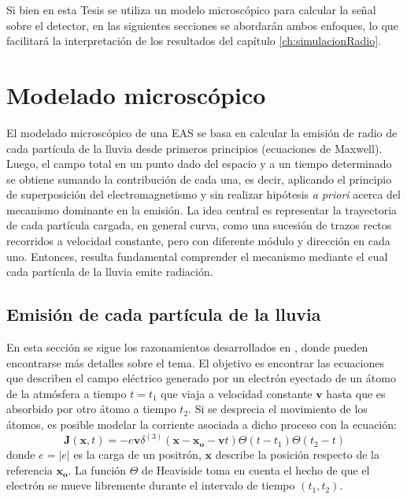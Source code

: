 Si bien en esta Tesis se utiliza un modelo microsc\'opico para calcular la se\~nal sobre el detector, en las siguientes secciones se abordar\'an ambos enfoques, lo que facilitar\'a la interpretaci\'on de los resultados del cap\'itulo \ref{ch:simulacionRadio}.

\section{Modelado microsc\'opico}

El modelado microsc\'opico de una EAS se basa en calcular la emisi\'on de radio de cada part\'icula de la lluvia desde primeros principios (ecuaciones de Maxwell).
Luego, el campo total en un punto dado del espacio y a un tiempo determinado se obtiene sumando la contribuci\'on de cada una, es decir, aplicando el principio de superposici\'on del electromagnetismo y sin realizar hip\'otesis \emph{a priori} acerca del mecanismo dominante en la emisi\'on.
La idea central es representar la trayectoria de cada part\'icula cargada, en general curva, como una sucesi\'on de trazos rectos recorridos a velocidad constante, pero con diferente m\'odulo y direcci\'on en cada uno.
Entonces, resulta fundamental comprender el mecanismo mediante el cual cada part\'icula de la lluvia emite radiaci\'on.

\subsection{Emisi\'on de cada part\'icula de la lluvia}

En esta secci\'on se sigue los razonamientos desarrollados en \cite{alvarez:2013}, donde pueden encontrarse m\'as detalles sobre el tema.
El objetivo es encontrar las ecuaciones que describen el campo el\'ectrico generado por un electr\'on eyectado de un \'atomo de la atm\'osfera a tiempo $t=t_1$ que viaja a velocidad constante $\mathbf{v}$ hasta que es absorbido por otro \'atomo a tiempo $t_2$.
Si se desprecia el movimiento de los \'atomos, es posible modelar la corriente asociada a dicho proceso con la ecuaci\'on:
%
\begin{equation}
\mathbf{J}(\mathbf{x},t)=-e\mathbf{v}\delta^{(3)}(\mathbf{x}-\mathbf{x_o}-\mathbf{v}t)
\Theta(t-t_1)\Theta(t_2-t)
\label{eq:eCurrent}
\end{equation}
%
donde $e=|e|$ es la carga de un positr\'on, $\mathbf{x}$ describe la posici\'on respecto de la referencia $\mathbf{x_o}$.
La funci\'on $\Theta$ de Heaviside toma en cuenta el hecho de que el electr\'on se mueve libremente durante el intervalo de tiempo $(t_1,t_2)$.

